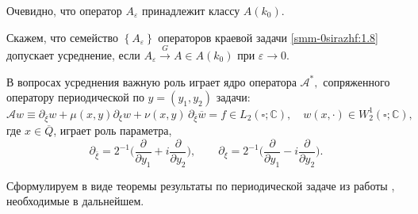 Очевидно, что оператор $A_\varepsilon$ принадлежит классу $A(k_0)$.


\begin{definition}
Скажем, что семейство $\left\{ A_\varepsilon \right\}$ операторов
краевой задачи \eqref{smm-0sirazhf:1.8}  допускает усреднение, если $A_\varepsilon \overset{G}{\longrightarrow}A\in A(k_0) $ при
$\varepsilon\to 0$.
\end{definition}
В вопросах усреднения важную роль играет ядро оператора $\mathcal{A}^*,$ сопряженного оператору периодической по $y=(y_1,y_2)$ задачи:
\begin{equation}\label{smm-0sirazhf:1.7}
	\mathcal{A}w\equiv \partial_{\overline{\xi}}w +\mu(x,y) \partial_{\xi}w +\nu(x,y)\,
	\partial_{\overline \xi}\overline w=f\in L_2(\square;\mathbb{C}),\quad
	w(x,\cdot)\in W_2^1(\square;\mathbb{C}),
\end{equation}
где  $x\in \overline Q$, играет роль параметра,
$$
\partial_{\bar \xi}=2^{-1}\Big(\frac{\partial}{\partial y_1}+i\frac{\partial}{\partial y_2}\Big),\qquad  \partial_{\xi}=2^{-1}\Big(\frac{\partial}{\partial y_1}-i\frac{\partial}{\partial y_2}\Big).
$$

Сформулируем в виде теоремы результаты по периодической задаче из работы \cite{smm-15}, необходимые в дальнейшем.




